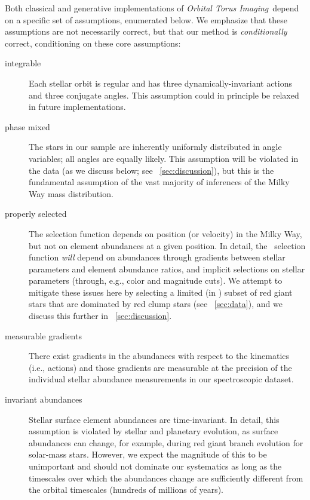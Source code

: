 \documentclass[modern]{aastex63}
\newcommand{\methodname}{\textsl{Orbital Torus Imaging}}
\newcommand{\apogee}{\acronym{APOGEE}}
\begin{document}
Both classical and generative implementations of \methodname\ depend on a
specific set of assumptions, enumerated below.
We emphasize that these assumptions are not necessarily correct, but that our
method is \emph{conditionally} correct, conditioning on these core assumptions:
\begin{description}
\item[integrable] Each stellar orbit is regular and has three
  dynamically-invariant actions and three conjugate angles. This assumption
  could in principle be relaxed in future implementations.
\item[phase mixed] The stars in our sample are inherently uniformly distributed
  in angle variables; all angles are equally likely. This assumption will be
  violated in the data (as we discuss below; see
  \sectionname~\ref{sec:discussion}), but this is the fundamental assumption of
  the vast majority of inferences of the Milky Way mass distribution.
\item[properly selected] The selection function depends on position (or
  velocity) in the Milky Way, but not on element abundances at a given position.
  In detail, the \apogee\ selection function \emph{will} depend on abundances
  through gradients between stellar parameters and element abundance ratios, and
  implicit selections on stellar parameters (through, e.g., color and magnitude
  cuts). We attempt to mitigate these issues here by selecting a limited (in
  \logg) subset of red giant stars that are dominated by red clump stars (see
  \sectionname~\ref{sec:data}), and we discuss this further in
  \sectionname~\ref{sec:discussion}.
\item[measurable gradients] There exist gradients in the abundances with respect
  to the kinematics (i.e., actions) and those gradients are measurable at the
  precision of the individual stellar abundance measurements in our
  spectroscopic dataset.
\item[invariant abundances] Stellar surface element abundances are
  time-invariant. In detail, this assumption is violated by stellar and
  planetary evolution, as surface abundances can change, for example, during red
  giant branch evolution \citep[e.g.,][]{Iben:1965, Martig:2016} for solar-mass
  stars. However, we expect the magnitude of this to be unimportant and should
  not dominate our systematics as long as the timescales over which the
  abundances change are sufficiently different from the orbital timescales
  (hundreds of millions of years).
\end{description}
\end{document}
